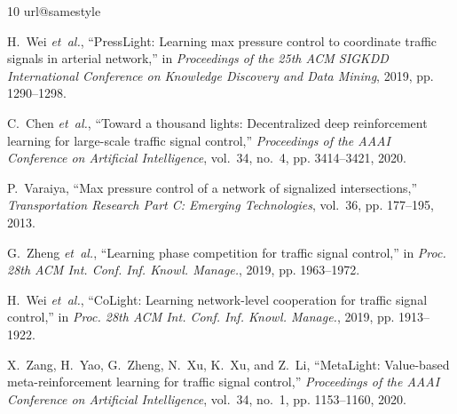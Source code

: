\documentclass[letterpaper,journal]{IEEEtran}
\begin{document}
\begin{thebibliography}{10}
\providecommand{\url}[1]{#1}
\csname url@samestyle\endcsname
\providecommand{\newblock}{\relax}
\providecommand{\bibinfo}[2]{#2}
\providecommand{\BIBentrySTDinterwordspacing}{\spaceskip=0pt\relax}
\providecommand{\BIBentryALTinterwordstretchfactor}{4}
\providecommand{\BIBentryALTinterwordspacing}{\spaceskip=\fontdimen2\font plus
\BIBentryALTinterwordstretchfactor\fontdimen3\font minus
  \fontdimen4\font\relax}
\providecommand{\BIBforeignlanguage}[2]{{%
\expandafter\ifx\csname l@#1\endcsname\relax
\typeout{** WARNING: IEEEtran.bst: No hyphenation pattern has been}%
\typeout{** loaded for the language `#1'. Using the pattern for}%
\typeout{** the default language instead.}%
\else
\language=\csname l@#1\endcsname
\fi
#2}}
\providecommand{\BIBdecl}{\relax}
\BIBdecl

H.~Wei \emph{et~al.}, ``{PressLight}:
  Learning max pressure control to coordinate traffic signals in arterial
  network,'' in \emph{Proceedings of the 25th ACM SIGKDD International
  Conference on Knowledge Discovery and Data Mining}, 2019, pp. 1290--1298.

C.~Chen \emph{et~al.}, ``Toward
  a thousand lights: Decentralized deep reinforcement learning for large-scale
  traffic signal control,'' \emph{Proceedings of the AAAI Conference on
  Artificial Intelligence}, vol.~34, no.~4, pp. 3414--3421, 2020.

P.~Varaiya, ``Max pressure control of a network of signalized intersections,''
  \emph{Transportation Research Part C: Emerging Technologies}, vol.~36, pp.
  177--195, 2013.

G.~Zheng \emph{et~al.}, ``Learning phase competition for traffic signal control,'' in \emph{Proc. 28th ACM Int. Conf. Inf. Knowl. Manage.}, 2019, pp. 1963--1972.

H.~Wei \emph{et~al.}, ``{CoLight}: Learning network-level cooperation for traffic signal control,'' in \emph{Proc. 28th ACM Int. Conf. Inf. Knowl. Manage.}, 2019, pp. 1913--1922.

X.~Zang, H.~Yao, G.~Zheng, N.~Xu, K.~Xu, and Z.~Li, ``{MetaLight}: Value-based
  meta-reinforcement learning for traffic signal control,'' \emph{Proceedings
  of the AAAI Conference on Artificial Intelligence}, vol.~34, no.~1, pp.
  1153--1160, 2020.


\end{thebibliography}
\end{document}
